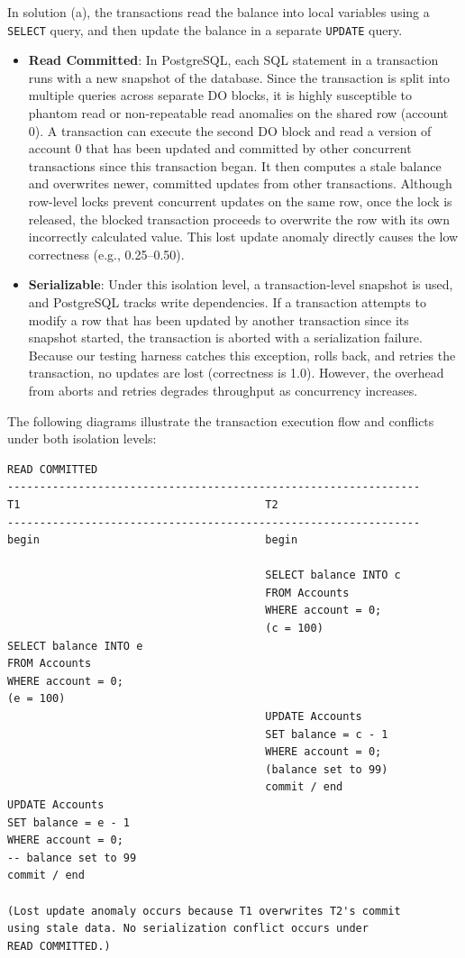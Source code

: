\documentclass[11pt]{scrartcl}
\begin{document}
In solution (a), the transactions read the balance into local variables using a \lstinline[style=dbtsql]{SELECT} query, and then update the balance in a separate \lstinline[style=dbtsql]{UPDATE} query.
\begin{itemize}
  \item \textbf{Read Committed}: In PostgreSQL, each SQL statement in a transaction runs with a new snapshot of the database. Since the transaction is split into multiple queries across separate DO blocks, it is highly susceptible to phantom read or non-repeatable read anomalies on the shared row (account 0). A transaction can execute the second DO block and read a version of account 0 that has been updated and committed by other concurrent transactions since this transaction began. It then computes a stale balance and overwrites newer, committed updates from other transactions. Although row-level locks prevent concurrent updates on the same row, once the lock is released, the blocked transaction proceeds to overwrite the row with its own incorrectly calculated value. This lost update anomaly directly causes the low correctness (e.g., 0.25--0.50).
  \item \textbf{Serializable}: Under this isolation level, a transaction-level snapshot is used, and PostgreSQL tracks write dependencies. If a transaction attempts to modify a row that has been updated by another transaction since its snapshot started, the transaction is aborted with a serialization failure. Because our testing harness catches this exception, rolls back, and retries the transaction, no updates are lost (correctness is 1.0). However, the overhead from aborts and retries degrades throughput as concurrency increases.
\end{itemize}

The following diagrams illustrate the transaction execution flow and conflicts under both isolation levels:

\begin{verbatim}
READ COMMITTED
----------------------------------------------------------------
T1                                      T2
----------------------------------------------------------------
begin                                   begin

                                        SELECT balance INTO c 
                                        FROM Accounts 
                                        WHERE account = 0;
                                        (c = 100)
SELECT balance INTO e 
FROM Accounts 
WHERE account = 0;
(e = 100)
                                        UPDATE Accounts 
                                        SET balance = c - 1 
                                        WHERE account = 0;
                                        (balance set to 99)
                                        commit / end
UPDATE Accounts 
SET balance = e - 1 
WHERE account = 0;
-- balance set to 99
commit / end

(Lost update anomaly occurs because T1 overwrites T2's commit
using stale data. No serialization conflict occurs under 
READ COMMITTED.)
\end{verbatim}
\end{document}
